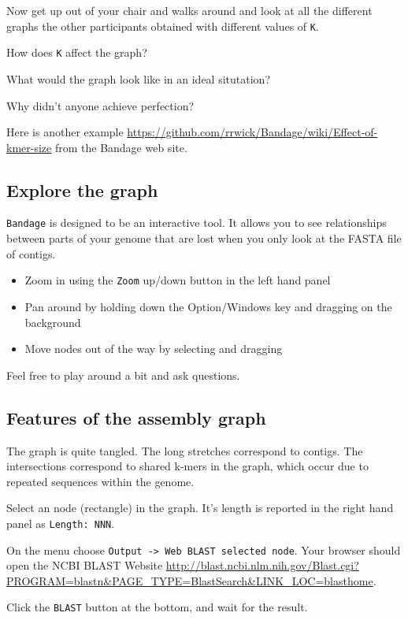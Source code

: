Now get up out of your chair and walks around and look at all the different graphs the other participants obtained with different values of \texttt{K}.
\begin{questions}
How does \texttt{K} affect the graph?
\begin{answer}
\end{answer}
What would the graph look like in an ideal situtation?
\begin{answer}
\end{answer}
Why didn't anyone achieve perfection?
\begin{answer}
\end{answer}
\end{questions}

Here is another example \url{https://github.com/rrwick/Bandage/wiki/Effect-of-kmer-size} from the Bandage web site. %

\subsection{Explore the graph}

\texttt{Bandage} is designed to be an interactive tool. It allows you to see relationships between parts of your genome that are lost when you only look at the FASTA file of contigs.
\begin{itemize}
\item Zoom in using the \texttt{Zoom} up/down button in the left hand panel
\item Pan around by holding down the Option/Windows key and dragging on the background
\item Move nodes out of the way by selecting and dragging
\end{itemize}
Feel free to play around a bit and ask questions.

\subsection{Features of the assembly graph}
The graph is quite tangled. The long stretches correspond to contigs. The intersections correspond to shared k-mers in the graph, which occur due to repeated sequences within the genome.
\begin{steps}
\item Select an node (rectangle) in the graph. It's length is reported in the right hand panel as \texttt{Length: NNN}.
\item On the menu choose \texttt{Output -> Web BLAST selected node}. Your browser should open the
   NCBI BLAST Website \url{http://blast.ncbi.nlm.nih.gov/Blast.cgi?PROGRAM=blastn&PAGE_TYPE=BlastSearch&LINK_LOC=blasthome}.
\item Click the \texttt{BLAST} button at the bottom, and wait for the result.
\end{steps}

